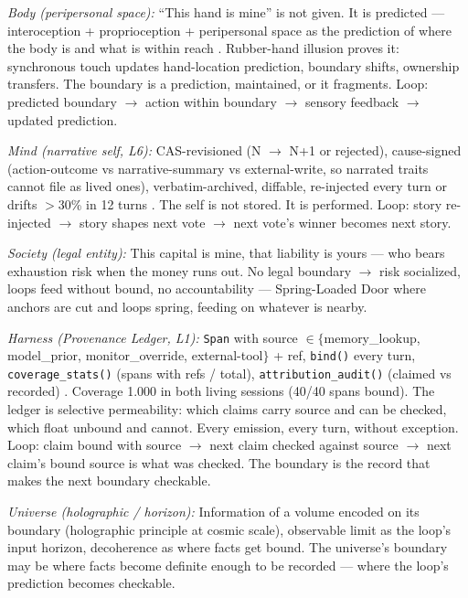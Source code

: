 \documentclass[11pt]{article}
\begin{document}
\textit{Body (peripersonal space):} ``This hand is mine'' is not given. It is predicted --- interoception + proprioception + peripersonal space as the prediction of where the body is and what is within reach \citep{seth2021}. Rubber-hand illusion proves it: synchronous touch updates hand-location prediction, boundary shifts, ownership transfers. The boundary is a prediction, maintained, or it fragments. Loop: predicted boundary $\to$\allowbreak{} action within boundary $\to$\allowbreak{} sensory feedback $\to$\allowbreak{} updated prediction.

\textit{Mind (narrative self, L6):} CAS-revisioned (N $\to$\allowbreak{} N+1 or rejected), cause-signed (action-outcome vs narrative-summary vs external-write, so narrated traits cannot file as lived ones), verbatim-archived, diffable, re-injected every turn or drifts $>$30\% in 12 turns \citep{choi2024}. The self is not stored. It is performed. Loop: story re-injected $\to$\allowbreak{} story shapes next vote $\to$\allowbreak{} next vote's winner becomes next story.

\textit{Society (legal entity):} This capital is mine, that liability is yours --- who bears exhaustion risk when the money runs out. No legal boundary $\to$\allowbreak{} risk socialized, loops feed without bound, no accountability --- Spring-Loaded Door where anchors are cut and loops spring, feeding on whatever is nearby.

\textit{Harness (Provenance Ledger, L1):} \texttt{Span} with source $\in\{$memory\_lookup, model\_prior, monitor\_override, external-tool$\}$ + ref, \texttt{bind()} every turn, \texttt{coverage\_stats()} (spans with refs / total), \texttt{attribution\_audit()} (claimed vs recorded) \citep{gazzaniga2000,johansson2005}. Coverage 1.000 in both living sessions (40/40 spans bound). The ledger is selective permeability: which claims carry source and can be checked, which float unbound and cannot. Every emission, every turn, without exception. Loop: claim bound with source $\to$\allowbreak{} next claim checked against source $\to$\allowbreak{} next claim's bound source is what was checked. The boundary is the record that makes the next boundary checkable.

\textit{Universe (holographic / horizon):} Information of a volume encoded on its boundary (holographic principle at cosmic scale), observable limit as the loop's input horizon, decoherence as where facts get bound. The universe's boundary may be where facts become definite enough to be recorded --- where the loop's prediction becomes checkable.
\end{document}
